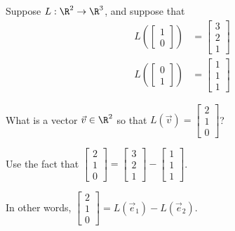 \documentclass{ximera}
\begin{document}
\begin{question}
  Suppose $L : \R^2 \to \R^3$, and suppose that
  \begin{align*}
    L\left(\begin{bmatrix} 1 \\ 0 \end{bmatrix}\right) &= \begin{bmatrix} 3 \\ 2 \\ 1 \end{bmatrix} \\
    L\left(\begin{bmatrix} 0 \\ 1 \end{bmatrix}\right) &= \begin{bmatrix} 1 \\ 1 \\ 1 \end{bmatrix}
  \end{align*}

  What is a vector $\vec{v} \in \R^2$ so that $L(\vec{v}) = \begin{bmatrix} 2 \\ 1 \\ 0 \end{bmatrix}$?

  \begin{solution}
    \begin{hint}
      Use the fact that $\begin{bmatrix} 2 \\ 1 \\ 0 \end{bmatrix} = \begin{bmatrix} 3 \\ 2 \\ 1 \end{bmatrix} - \begin{bmatrix} 1 \\ 1 \\ 1 \end{bmatrix}$.
    \end{hint}

    \begin{hint}
      In other words, $\begin{bmatrix} 2 \\ 1 \\ 0 \end{bmatrix} = L(\vec{e}_1) - L(\vec{e}_2)$.
    \end{hint}


\end{solution}
\end{question}
\end{document}

